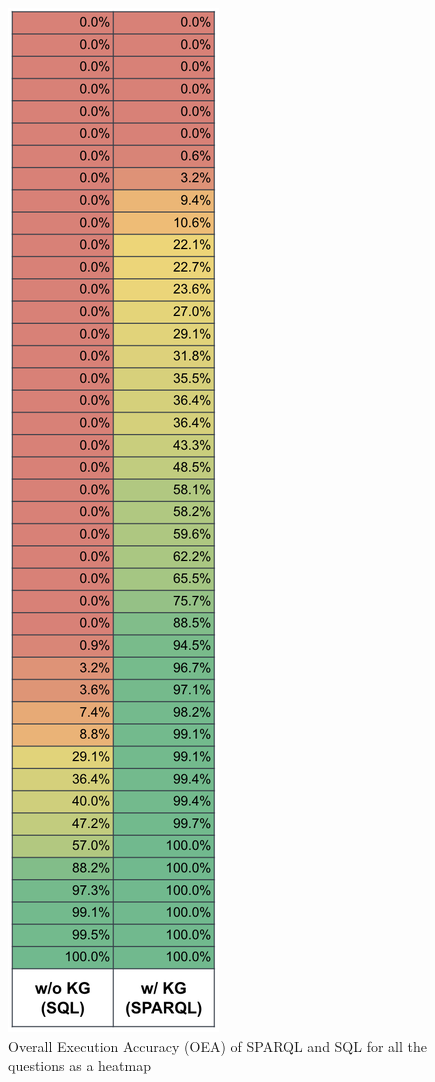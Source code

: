 \documentclass[11pt]{article}
\begin{document}
\begin{figure}
  \begin{center}
\includegraphics[scale=0.5]{submissions/Juan2024/results/overall_heatmap.png}
\caption{Overall Execution Accuracy (OEA) of SPARQL and SQL for all the questions as a heatmap}
\label{fig:fig2}
\end{center}
\end{figure}
\end{document}
